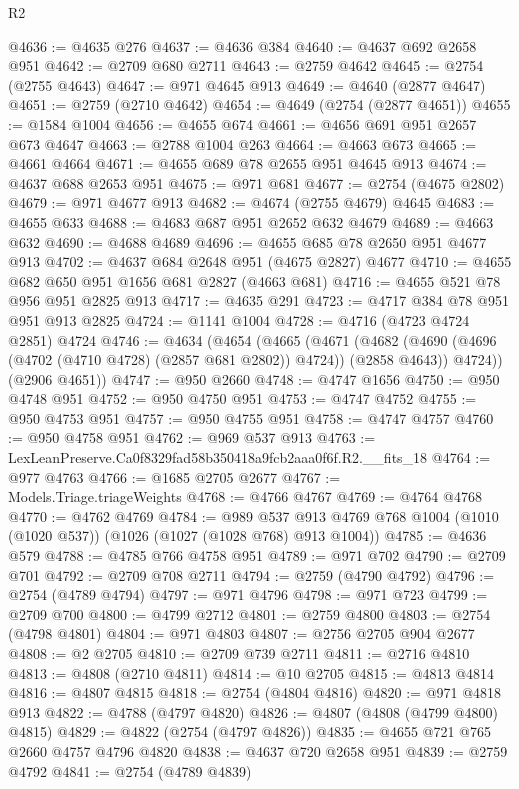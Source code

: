 \begin{lexlean}{R2}
\begin{coremodule}
@4636 := @4635 @276
@4637 := @4636 @384
@4640 := @4637 @692 @2658 @951
@4642 := @2709 @680 @2711
@4643 := @2759 @4642
@4645 := @2754 (@2755 @4643)
@4647 := @971 @4645 @913
@4649 := @4640 (@2877 @4647)
@4651 := @2759 (@2710 @4642)
@4654 := @4649 (@2754 (@2877 @4651))
@4655 := @1584 @1004
@4656 := @4655 @674
@4661 := @4656 @691 @951 @2657 @673 @4647
@4663 := @2788 @1004 @263
@4664 := @4663 @673
@4665 := @4661 @4664
@4671 := @4655 @689 @78 @2655 @951 @4645 @913
@4674 := @4637 @688 @2653 @951
@4675 := @971 @681
@4677 := @2754 (@4675 @2802)
@4679 := @971 @4677 @913
@4682 := @4674 (@2755 @4679) @4645
@4683 := @4655 @633
@4688 := @4683 @687 @951 @2652 @632 @4679
@4689 := @4663 @632
@4690 := @4688 @4689
@4696 := @4655 @685 @78 @2650 @951 @4677 @913
@4702 := @4637 @684 @2648 @951 (@4675 @2827) @4677
@4710 := @4655 @682 @650 @951 @1656 @681 @2827 (@4663 @681)
@4716 := @4655 @521 @78 @956 @951 @2825 @913
@4717 := @4635 @291
@4723 := @4717 @384 @78 @951 @951 @913 @2825
@4724 := @1141 @1004
@4728 := @4716 (@4723 @4724 @2851) @4724
@4746 := @4634
    (@4654
      (@4665
        (@4671
          (@4682 (@4690 (@4696 (@4702 (@4710 @4728) (@2857 @681 @2802)) @4724)) (@2858 @4643))
          @4724))
      (@2906 @4651))
@4747 := @950 @2660
@4748 := @4747 @1656
@4750 := @950 @4748 @951
@4752 := @950 @4750 @951
@4753 := @4747 @4752
@4755 := @950 @4753 @951
@4757 := @950 @4755 @951
@4758 := @4747 @4757
@4760 := @950 @4758 @951
@4762 := @969 @537 @913
@4763 := LexLeanPreserve.Ca0f8329fad58b350418a9fcb2aaa0f6f.R2.__fits_18
@4764 := @977 @4763
@4766 := @1685 @2705 @2677
@4767 := Models.Triage.triageWeights
@4768 := @4766 @4767
@4769 := @4764 @4768
@4770 := @4762 @4769
@4784 := @989
    @537
    @913
    @4769
    @768
    @1004
    (@1010 (@1020 @537))
    (@1026 (@1027 (@1028 @768) @913 @1004))
@4785 := @4636 @579
@4788 := @4785 @766 @4758 @951
@4789 := @971 @702
@4790 := @2709 @701
@4792 := @2709 @708 @2711
@4794 := @2759 (@4790 @4792)
@4796 := @2754 (@4789 @4794)
@4797 := @971 @4796
@4798 := @971 @723
@4799 := @2709 @700
@4800 := @4799 @2712
@4801 := @2759 @4800
@4803 := @2754 (@4798 @4801)
@4804 := @971 @4803
@4807 := @2756 @2705 @904 @2677
@4808 := @2 @2705
@4810 := @2709 @739 @2711
@4811 := @2716 @4810
@4813 := @4808 (@2710 @4811)
@4814 := @10 @2705
@4815 := @4813 @4814
@4816 := @4807 @4815
@4818 := @2754 (@4804 @4816)
@4820 := @971 @4818 @913
@4822 := @4788 (@4797 @4820)
@4826 := @4807 (@4808 (@4799 @4800) @4815)
@4829 := @4822 (@2754 (@4797 @4826))
@4835 := @4655 @721 @765 @2660 @4757 @4796 @4820
@4838 := @4637 @720 @2658 @951
@4839 := @2759 @4792
@4841 := @2754 (@4789 @4839)

\end{coremodule}
\end{lexlean}
